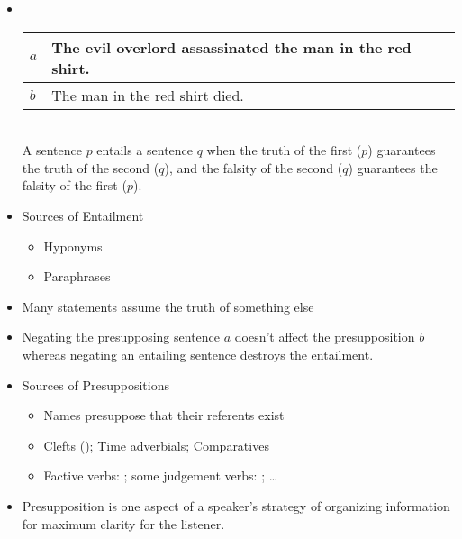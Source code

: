 \documentclass[headrule,footrule]{foils}
\begin{document}
\begin{itemize}
\item {} \\[2ex]
  \begin{tabular}{ll}
    $a$ &The evil overlord  assassinated the man in the red shirt. \\ \hline
    $b$ &The man  in the red shirt died.
  \end{tabular}
  \\[2ex]
  A sentence $p$ entails a sentence $q$ when the truth of the first ($p$)
  guarantees the truth of the second ($q$), and the falsity of the
  second ($q$) guarantees the falsity of the first ($p$).
\item Sources of Entailment
\begin{itemize}
\item Hyponyms
  \begin{exe}
    \ex {}
  \end{exe}
\item Paraphrases
  \begin{exe}
    \ex {}
  \end{exe}
\end{itemize}
\end{itemize}


\begin{itemize}
\item Many statements assume the truth of something else
  \begin{exe}
    \ex   \begin{xlist}
    \ex {} %
    \ex {} %
    \end{xlist}
  \end{exe}
\item Negating the presupposing sentence $a$ doesn't affect the presupposition $b$
 whereas negating an entailing sentence destroys the entailment.
\item Sources of Presuppositions
  \begin{itemize}
  \item Names presuppose that their referents exist
  \item Clefts (); Time adverbials; Comparatives
  \item Factive verbs: ; 
    some judgement verbs: ; \ldots
  \end{itemize}
\item Presupposition is one aspect of a speaker’s strategy of
organizing information for maximum clarity for the listener.
\end{itemize}
\end{document}
